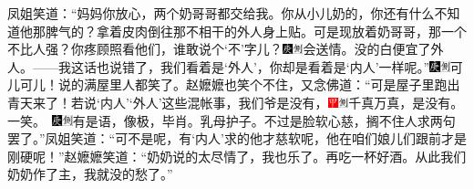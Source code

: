 {{{{{凤姐笑道：“妈妈你放心，两个奶哥哥都交给我。你从小儿奶的，你还有什么不知道他那脾气的？拿着皮肉倒往那不相干的外人身上贴。可是现放着奶哥哥，那一个不比人强？你疼顾照看他们，谁敢说个‘不’字儿？{\includegraphics[width=3mm]{../Images/00004}\includegraphics[width=3mm]{../Images/00011}\footnotesize \kaishu 会送情。}没的白便宜了外人。------我这话也说错了，我们看着是‘外人’，你却是看着是‘内人’一样呢。”{\includegraphics[width=3mm]{../Images/00004}\includegraphics[width=3mm]{../Images/00011}\footnotesize \kaishu 可儿可儿！}说的满屋里人都笑了。赵嬷嬷也笑个不住，又念佛道：“可是屋子里跑出青天来了！若说‘内人’‘外人’这些混帐事，我们爷是没有，{\includegraphics[width=3mm]{../Images/00002}\includegraphics[width=3mm]{../Images/00011}\footnotesize \kaishu 千真万真，是没有。一笑。　\includegraphics[width=3mm]{../Images/00004}\includegraphics[width=3mm]{../Images/00011}\footnotesize \kaishu 有是语，像极，毕肖。乳母护子。}不过是脸软心慈，搁不住人求两句罢了。”凤姐笑道：“可不是呢，有‘内人’求的他才慈软呢，他在咱们娘儿们跟前才是刚硬呢！”赵嬷嬷笑道：“奶奶说的太尽情了，我也乐了。再吃一杯好酒。从此我们奶奶作了主，我就没的愁了。”

}}}}}
